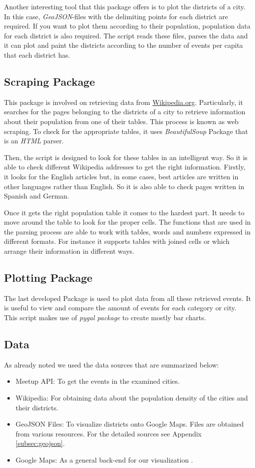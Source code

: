 Another interesting tool that this package offers is to plot the districts of a city. In this case, \emph{GeoJSON}-files with the delimiting points for each district are required. If you want to plot them according to their population, population data for each district is also required. The script reads these files, parses the data and it can plot and paint the districts according to the number of events per capita that each district has.

\subsection{Scraping Package}
This package is involved on retrieving data from \url{Wikipedia.org}. Particularly, it searches for the pages belonging to the districts of a city to retrieve information about their population from one of their tables. This process is known as web scraping. To check for the appropriate tables, it uses \textit{BeautifulSoup} Package that is an \emph{HTML} parser.

Then, the script is designed to look for these tables in an intelligent way.  So it is able to check different Wikipedia addresses to get the right information.  Firstly, it looks for the English articles but, in some cases, best articles are written in other languages rather than English. So it is also able to check pages written in Spanish and German.

Once it gets the right population table it comes to the hardest part. It needs to move around the table to look for the proper cells. The functions that are used in the parsing process are able to work with tables, words and numbers expressed in different formats. For instance it supports tables with joined cells or which arrange their information in different ways.

\subsection{Plotting Package}
The last developed Package is used to plot data from all these retrieved events. It is useful to view and compare the amount of events for each category or city. This script makes use of \textit{pygal package} \cite{pygal} to create mostly bar charts. 

\subsection{Data}

As already noted we used the data sources that are summarized below:

\begin{itemize}
\item Meetup API: To get the events in the examined cities. 
\item Wikipedia: For obtaining data about the population density of the cities and their districts. 
\item GeoJSON Files: To visualize districts onto Google Maps. Files are obtained from various resources. For the detailed sources see Appendix \ref{subsec:geojson}.
\item Google Maps: As a general back-end for our visualization \cite{googlemaps}.
\end{itemize}